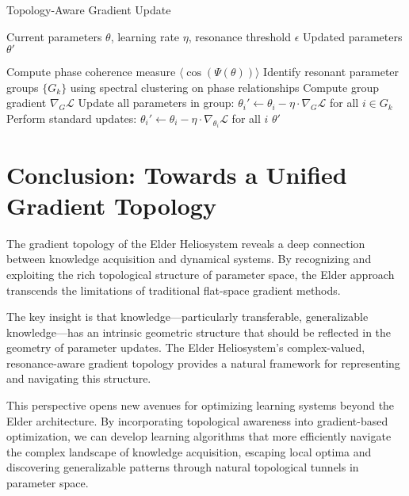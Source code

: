 \begin{algorithm}
\caption{Topology-Aware Gradient Update}
\begin{algorithmic}[1]
\Require Current parameters $\theta$, learning rate $\eta$, resonance threshold $\epsilon$
\Ensure Updated parameters $\theta'$

\State Compute phase coherence measure $\langle\cos(\Psi(\theta))\rangle$
    \State Identify resonant parameter groups $\{G_k\}$ using spectral clustering on phase relationships
        \State Compute group gradient $\nabla_G \mathcal{L}$
        \State Update all parameters in group: $\theta_i' \leftarrow \theta_i - \eta \cdot \nabla_G \mathcal{L}$ for all $i \in G_k$
    \EndFor
\Else
    \State Perform standard updates: $\theta_i' \leftarrow \theta_i - \eta \cdot \nabla_{\theta_i} \mathcal{L}$ for all $i$
\EndIf
\State \Return $\theta'$
\end{algorithmic}
\end{algorithm}

\section{Conclusion: Towards a Unified Gradient Topology}

The gradient topology of the Elder Heliosystem reveals a deep connection between knowledge acquisition and dynamical systems. By recognizing and exploiting the rich topological structure of parameter space, the Elder approach transcends the limitations of traditional flat-space gradient methods.

The key insight is that knowledge—particularly transferable, generalizable knowledge—has an intrinsic geometric structure that should be reflected in the geometry of parameter updates. The Elder Heliosystem's complex-valued, resonance-aware gradient topology provides a natural framework for representing and navigating this structure.

This perspective opens new avenues for optimizing learning systems beyond the Elder architecture. By incorporating topological awareness into gradient-based optimization, we can develop learning algorithms that more efficiently navigate the complex landscape of knowledge acquisition, escaping local optima and discovering generalizable patterns through natural topological tunnels in parameter space.